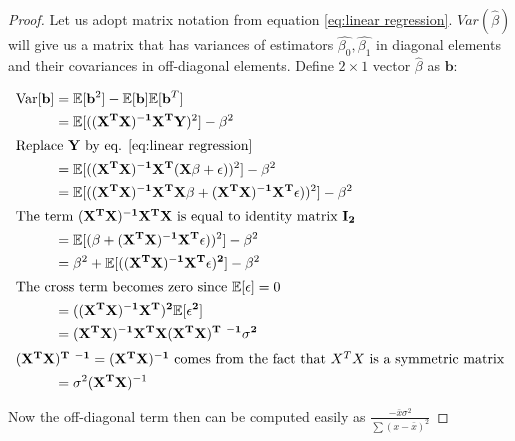 \documentclass[12pt,a4paper,oneside]{book} %
\newcommand{\E}{\mathbb{E}}
\newcommand{\Var}{\mathrm{Var}}
\begin{document}
\begin{proof}
	Let us adopt matrix notation from equation \ref{eq:linear regression}.
	$Var(\hat{\beta})$ will give us a matrix that has variances of estimators $\hat{\beta_0}, \hat{\beta_1}$ in diagonal elements and their covariances in off-diagonal elements. Define $2 \times 1$ vector $\hat{\beta}$ as $\mathbf{b}$:
	
	\begin{align*}
		\Var [\mathbf{b}] &= \E [\mathbf{b}^2] - \E [\mathbf{b}] \E[\mathbf{b}^T] \\
		&= \E [\mathbf{((X^TX)^{-1}X^TY})^2] - \beta^2 \\
		\intertext{Replace $\mathbf{Y}$ by eq. \ref{eq:linear regression}}
		&= \E [\mathbf{((X^TX)^{-1}X^T(X
			\beta+\epsilon)})^2] - \beta^2 \\
		&= \E [\mathbf{((X^TX)^{-1}X^TX
			\beta+(X^TX)^{-1}X^T\epsilon)})^2] - \beta^2 \\
	\intertext{The term $\mathbf{(X^TX)^{-1}X^TX
	}$ is equal to identity matrix $\mathbf{I_2}$ }
		&=  \E [\mathbf{(\beta+(X^TX)^{-1}X^T\epsilon)})^2] - \beta^2 \\
		&=  \beta^2 + \mathbf{\E [((X^TX)^{-1}X^T\epsilon)^2]} - \beta^2 \\
		\intertext{The cross term becomes zero since $\E [\epsilon]=0$}
		&= \mathbf{((X^TX)^{-1}X^T)^2\E [\epsilon^2]} \\
		&= \mathbf{(X^TX)^{-1}X^TX(X^TX)^T \ ^{-1} \sigma^2} \\
		\intertext{$\mathbf{(X^TX)^T \ ^{-1}= (X^TX)^{-1}}$ comes from the fact that $X^TX$ is a symmetric matrix}
		&= \sigma^2 (\mathbf{X^TX})^{-1}
	\end{align*}
	
	Now the off-diagonal term then can be computed easily as $\frac{-\bar{x}\sigma^2}{\sum (x-\bar{x})^2}$
	
\end{proof}
\end{document}
